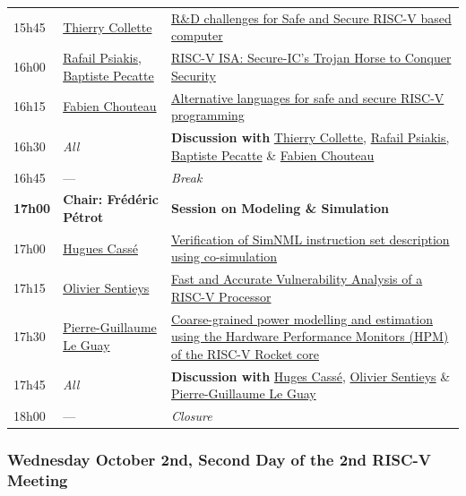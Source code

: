 \documentclass[a4paper, 10pt]{article}
\begin{document}
\begin{center}
\begin{tabular}{l|p{4cm}|p{11cm}}
\hline
15h45 & \hyperref[sec:org81512d2]{Thierry Collette} & \hyperref[sec:org81512d2]{R\&D challenges for Safe and Secure RISC-V based computer}\\
16h00 & \hyperref[sec:org80a67cf]{Rafail Psiakis, Baptiste Pecatte} & \hyperref[sec:org80a67cf]{RISC-V ISA: Secure-IC's Trojan Horse to Conquer Security}\\
16h15 & \hyperref[sec:orgc9cca85]{Fabien Chouteau} & \hyperref[sec:orgc9cca85]{Alternative languages for safe and secure RISC-V programming}\\
16h30 & \emph{All} & \textbf{Discussion with} \hyperref[sec:org81512d2]{Thierry Collette}, \hyperref[sec:org80a67cf]{Rafail Psiakis, Baptiste Pecatte} \& \hyperref[sec:orgc9cca85]{Fabien Chouteau}\\
\hline
16h45 & --- & \emph{Break}\\
\hline
\textbf{17h00} & \textbf{Chair: Frédéric Pétrot} & \textbf{Session on Modeling \& Simulation}\\
\hline
17h00 & \hyperref[sec:org49f51bd]{Hugues Cassé} & \hyperref[sec:org49f51bd]{Verification of SimNML instruction set description using co-simulation}\\
17h15 & \hyperref[sec:orgc2ba8cf]{Olivier Sentieys} & \hyperref[sec:orgc2ba8cf]{Fast and Accurate Vulnerability Analysis of a RISC-V Processor}\\
17h30 & \hyperref[sec:orgf2630f5]{Pierre-Guillaume Le Guay} & \hyperref[sec:orgf2630f5]{Coarse-grained power modelling and estimation using the Hardware Performance Monitors (HPM) of the RISC-V Rocket core}\\
17h45 & \emph{All} & \textbf{Discussion with} \hyperref[sec:org49f51bd]{Huges Cassé}, \hyperref[sec:orgc2ba8cf]{Olivier Sentieys} \& \hyperref[sec:orgf2630f5]{Pierre-Guillaume Le Guay}\\
\hline
18h00 & --- & \emph{Closure}\\
\hline
\end{tabular}
\end{center}

\subsubsection{Wednesday October 2nd, Second Day of the 2nd RISC-V Meeting}
\label{sec:orgc78d559}
\end{document}
